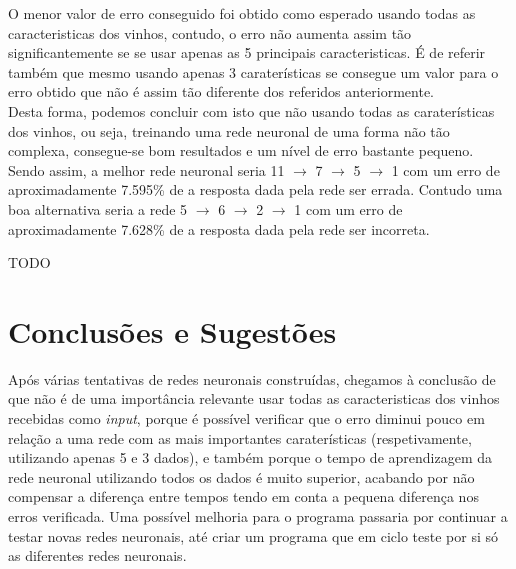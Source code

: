 \documentclass{article}
\begin{document}
O menor valor de erro conseguido foi obtido como esperado usando todas as caracteristicas dos vinhos, contudo, o erro não aumenta assim tão significantemente se se usar apenas as 5 principais caracteristicas. É de referir também que mesmo usando apenas 3 caraterísticas se consegue um valor para o erro obtido que não é assim tão diferente dos referidos anteriormente.\\
Desta forma, podemos concluir com isto que não usando todas as caraterísticas dos vinhos, ou seja, treinando uma rede neuronal de uma forma não tão complexa, consegue-se bom resultados e um nível de erro bastante pequeno.
Sendo assim, a melhor rede neuronal seria 11 $\to$ 7 $\to$ 5 $\to$ 1 com um erro de aproximadamente 7.595\% de a resposta dada pela rede ser errada. Contudo uma boa alternativa seria a rede 5 $\to$ 6 $\to$ 2 $\to$ 1 com um erro de aproximadamente 7.628\% de a resposta dada pela rede ser incorreta.

{\color{red}TODO}

\newpage

\vspace*{\fill}
\section{Conclusões e Sugestões}
Após várias tentativas de redes neuronais construídas, chegamos à conclusão de que não é de uma importância relevante usar todas as caracteristicas dos vinhos recebidas como \textit{input}, porque é possível verificar que o erro diminui pouco em relação a uma rede com as mais importantes caraterísticas (respetivamente, utilizando apenas 5 e 3 dados), e também porque o tempo de aprendizagem da rede neuronal utilizando todos os dados é muito superior, acabando por não compensar a diferença entre tempos tendo em conta a pequena diferença nos erros verificada. Uma possível melhoria para o programa passaria por continuar a testar novas redes neuronais, até criar um programa que em ciclo teste por si só as diferentes redes neuronais.
\vspace*{\fill}

\newpage
\end{document}
